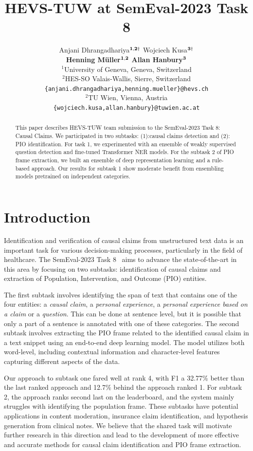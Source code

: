 \documentclass[11pt]{article}
\title{HEVS-TUW at SemEval-2023 Task 8}
\author{Anjani Dhrangadhariya\hspace{1pt}$^{{{\bf 1,2}}\dag}$ \hspace{.7cm} Wojciech Kusa\hspace{1pt}$^{{\bf 3}\dag}$ \\[0.15cm] {\bf Henning Müller\hspace{1pt}$^{{\bf 1,2}}$}  \hspace{.7cm}  {\bf Allan Hanbury\hspace{1pt}$^{{\bf 3}}$}
\\[0.4cm]
{$^1$University of Geneva, Geneva, Switzerland} \\
{$^2$HES-SO Valais-Wallis, Sierre, Switzerland} \\
{\tt \{anjani.dhrangadhariya,henning.mueller\}@hevs.ch} \\
{$^2$TU Wien, Vienna, Austria} \\
{\tt \{wojciech.kusa,allan.hanbury\}@tuwien.ac.at} \\
}
\begin{document}
\maketitle
{\let\thefootnote\relax{}}

\begin{abstract}
This paper describes HEVS-TUW team submission to the SemEval-2023 Task 8: Causal Claims.
We participated in two subtasks: (1):causal claims detection and (2): PIO identification.
For task 1, we experimented with an ensemble of weakly supervised question detection and fine-tuned Transformer NER models.
For the subtask 2 of PIO frame extraction, we built an ensemble of deep representation learning and a rule-based approach. 
Our results for subtask 1 show moderate benefit from ensembling models pretrained on independent categories.

\end{abstract}

\section{Introduction}

% 
Identification and verification of causal claims from unstructured text data is an important task for various decision-making processes, particularly in the field of healthcare. The SemEval-2023 Task 8~\cite{CausalClaims} aims to advance the state-of-the-art in this area by focusing on two subtasks: identification of causal claims and extraction of Population, Intervention, and Outcome (PIO) entities.

% 
The first subtask involves identifying the span of text that contains one of the four entities: a \emph{causal claim}, a \emph{personal experience}, a \emph{personal experience based on a claim} or a \emph{question}. 
This can be done at sentence level, but it is possible that only a part of a sentence is annotated with one of these categories. 
The second subtask involves extracting the PIO frame related to the identified causal claim in a text snippet using an end-to-end deep learning model.
The model utilizes both word-level, including contextual information and character-level features capturing different aspects of the data.

Our approach to subtask one fared well at rank 4, with F1 a 32.77\% better than the last ranked approach and 12.7\% behind the approach ranked 1.
For subtask 2, the approach ranks second last on the leaderboard, and the system mainly struggles with identifying the population frame.
These subtasks have potential applications in content moderation, insurance claim identification, and hypothesis generation from clinical notes.
We believe that the shared task will motivate further research in this direction and lead to the development of more effective and accurate methods for causal claim identification and PIO frame extraction.
%
%
%
\end{document}
